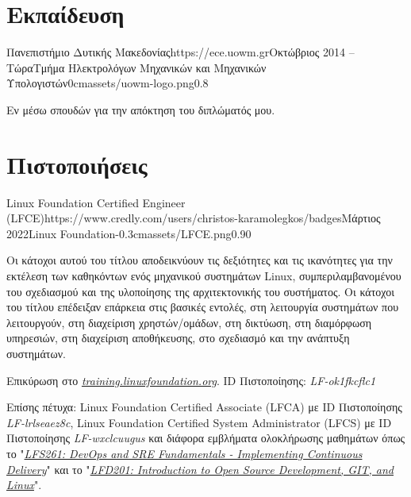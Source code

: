 \documentclass{mycv}
\begin{document}
	\section{Εκπαίδευση}

	\begin{EntryDatedLogo}{Πανεπιστήμιο Δυτικής Μακεδονίας}{https://ece.uowm.gr}{Οκτώβριος 2014 -- Τώρα}{Τμήμα Ηλεκτρολόγων Μηχανικών και Μηχανικών Υπολογιστών}{0cm}{assets/uowm-logo.png}{0.8}
		\vspace{-0.2cm}
		\begin{Itemize}
			\item Εν μέσω σπουδών για την απόκτηση του διπλώματός μου.
		\end{Itemize}
	\end{EntryDatedLogo}

	\section{Πιστοποιήσεις}
    \begin{EntryDatedLogo}{Linux Foundation Certified Engineer (LFCE)}{https://www.credly.com/users/christos-karamolegkos/badges}{Μάρτιος 2022}{Linux Foundation}{-0.3cm}{assets/LFCE.png}{0.90}
    	\vspace{-0.2cm}
		\begin{Itemize}
			\item Οι κάτοχοι αυτού του τίτλου αποδεικνύουν τις δεξιότητες και τις ικανότητες για την εκτέλεση των καθηκόντων ενός μηχανικού συστημάτων Linux, συμπεριλαμβανομένου του σχεδιασμού και της υλοποίησης της αρχιτεκτονικής του συστήματος. Οι κάτοχοι του τίτλου επέδειξαν επάρκεια στις βασικές εντολές, στη λειτουργία συστημάτων που λειτουργούν, στη διαχείριση χρηστών/ομάδων, στη δικτύωση, στη διαμόρφωση υπηρεσιών, στη διαχείριση αποθήκευσης, στο σχεδιασμό και την ανάπτυξη συστημάτων.
			\item Επικύρωση στο \href{https://training.linuxfoundation.org/certification/verify-linux-certifications}{\textit{training.linuxfoundation.org}}. ID Πιστοποίησης: \textit{LF-ok1fkcflc1}
			\item Επίσης πέτυχα: Linux Foundation Certified Associate (LFCA) με ID Πιστοποίησης \textit{LF-lrlseaez8c}, Linux Foundation Certified System Administrator (LFCS) με ID Πιστοποίησης \textit{LF-wxclcuugus} και διάφορα εμβλήματα ολοκλήρωσης μαθημάτων όπως το "\href{https://www.credly.com/badges/19ff66ca-2e10-4e1b-90a9-1c1ac6132878}{\textit{LFS261: DevOps and SRE Fundamentals - Implementing Continuous Delivery}}" και το "\href{https://www.credly.com/badges/1fc7edfc-227e-4e93-ac46-297ab05c27db}{\textit{LFD201: Introduction to Open Source Development, GIT, and Linux}}".
		\end{Itemize}
	\end{EntryDatedLogo}
\end{document}
